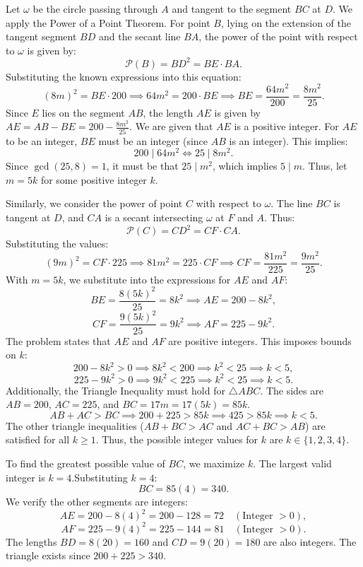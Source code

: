 \begin{enumerate}
 Let $\omega$ be the circle passing through $A$ and tangent to the segment $BC$ at $D$. We apply the Power of a Point Theorem. For point $B$, lying on the extension of the tangent segment $BD$ and the secant line $BA$, the power of the point with respect to $\omega$ is given by:
 \[\mathcal{P}(B) = BD^2 = BE \cdot BA.\]Substituting the known expressions into this equation:
 \[(8m)^2 = BE \cdot 200 \implies 64m^2 = 200 \cdot BE \implies BE = \frac{64m^2}{200} = \frac{8m^2}{25}.\]Since $E$ lies on the segment $AB$, the length $AE$ is given by $AE = AB - BE = 200 - \frac{8m^2}{25}$. We are given that $AE$ is a positive integer. For $AE$ to be an integer, $BE$ must be an integer (since $AB$ is an integer). This implies:
 \[200 \mid 64m^2 \iff 25 \mid 8m^2.\]Since $\gcd(25, 8) = 1$, it must be that $25 \mid m^2$, which implies $5 \mid m$. Thus, let $m = 5k$ for some positive integer $k$.

 Similarly, we consider the power of point $C$ with respect to $\omega$. The line $BC$ is tangent at $D$, and $CA$ is a secant intersecting $\omega$ at $F$ and $A$. Thus:
 \[\mathcal{P}(C) = CD^2 = CF \cdot CA.\]Substituting the values:
 \[(9m)^2 = CF \cdot 225 \implies 81m^2 = 225 \cdot CF \implies CF = \frac{81m^2}{225} = \frac{9m^2}{25}.\]With $m = 5k$, we substitute into the expressions for $AE$ and $AF$:
 \[BE = \frac{8(5k)^2}{25} = 8k^2 \implies AE = 200 - 8k^2,\]
 \[CF = \frac{9(5k)^2}{25} = 9k^2 \implies AF = 225 - 9k^2.\]The problem states that $AE$ and $AF$ are positive integers. This imposes bounds on $k$:
 \[200 - 8k^2 > 0 \implies 8k^2 < 200 \implies k^2 < 25 \implies k < 5,\]
 \[225 - 9k^2 > 0 \implies 9k^2 < 225 \implies k^2 < 25 \implies k < 5.\]Additionally, the Triangle Inequality must hold for $\triangle ABC$. The sides are $AB=200$, $AC=225$, and $BC = 17m = 17(5k) = 85k$.
 \[AB + AC > BC \implies 200 + 225 > 85k \implies 425 > 85k \implies k < 5.\]The other triangle inequalities ($AB+BC > AC$ and $AC+BC > AB$) are satisfied for all $k \ge 1$. Thus, the possible integer values for $k$ are $k \in \{1, 2, 3, 4\}$.

 To find the greatest possible value of $BC$, we maximize $k$. The largest valid integer is $k = 4$.Substituting $k=4$:
 \[BC = 85(4) = 340.\]We verify the other segments are integers:
 \[AE = 200 - 8(4)^2 = 200 - 128 = 72 \quad (\text{Integer } > 0),\]
 \[AF = 225 - 9(4)^2 = 225 - 144 = 81 \quad (\text{Integer } > 0).\]The lengths $BD = 8(20) = 160$ and $CD = 9(20) = 180$ are also integers. The triangle exists since $200+225 > 340$.


\end{enumerate}
